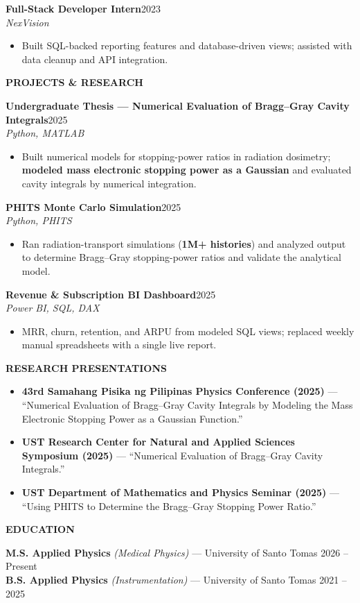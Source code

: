 \documentclass[10pt,letterpaper]{article}
\newcommand{\rsec}[1]{%
  \vspace{6pt}%
  {\normalsize\bfseries\color{accent}\MakeUppercase{#1}}\par
  \vspace{1pt}{\color{accent}\hrule height 1pt}\vspace{4pt}%
}
\newcommand{\job}[3]{%
  \vspace{4pt}%
  {\bfseries #1}\hfill{\small\color{muted}#2}\\
  {\itshape #3}\par\vspace{1pt}%
}
\newenvironment{bullets}
  {\begin{itemize}[leftmargin=1.25em,itemsep=1pt,topsep=1pt,parsep=0pt,
     label=\textcolor{accent}{\footnotesize$\bullet$}]}
  {\end{itemize}}
\begin{document}
\job{Full-Stack Developer Intern}{2023}{NexVision}
\begin{bullets}
  \item Built SQL-backed reporting features and database-driven views; assisted with data cleanup and API integration.
\end{bullets}

\rsec{Projects \& Research}

\job{Undergraduate Thesis --- Numerical Evaluation of Bragg--Gray Cavity Integrals}{2025}{Python, MATLAB}
\begin{bullets}
  \item Built numerical models for stopping-power ratios in radiation dosimetry; \textbf{modeled mass electronic stopping power as a Gaussian} and evaluated cavity integrals by numerical integration.
\end{bullets}

\job{PHITS Monte Carlo Simulation}{2025}{Python, PHITS}
\begin{bullets}
  \item Ran radiation-transport simulations (\textbf{1M+ histories}) and analyzed output to determine Bragg--Gray stopping-power ratios and validate the analytical model.
\end{bullets}

\job{Revenue \& Subscription BI Dashboard}{2025}{Power BI, SQL, DAX}
\begin{bullets}
  \item MRR, churn, retention, and ARPU from modeled SQL views; replaced weekly manual spreadsheets with a single live report.
\end{bullets}

\rsec{Research Presentations}
\begin{bullets}
  \item \textbf{43rd Samahang Pisika ng Pilipinas Physics Conference (2025)} --- ``Numerical Evaluation of Bragg--Gray Cavity Integrals by Modeling the Mass Electronic Stopping Power as a Gaussian Function.''
  \item \textbf{UST Research Center for Natural and Applied Sciences Symposium (2025)} --- ``Numerical Evaluation of Bragg--Gray Cavity Integrals.''
  \item \textbf{UST Department of Mathematics and Physics Seminar (2025)} --- ``Using PHITS to Determine the Bragg--Gray Stopping Power Ratio.''
\end{bullets}

\rsec{Education}
{\bfseries M.S. Applied Physics} {\itshape (Medical Physics)} --- University of Santo Tomas \hfill {\small\color{muted}2026 -- Present}\\
{\bfseries B.S. Applied Physics} {\itshape (Instrumentation)} --- University of Santo Tomas \hfill {\small\color{muted}2021 -- 2025}
\end{document}
